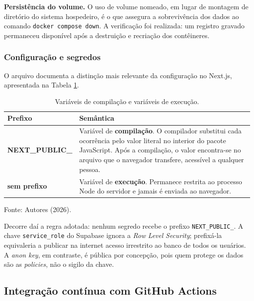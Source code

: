 \documentclass[12pt,a4paper]{article}
\begin{document}
\textbf{Persistência do volume.} O uso de volume nomeado, em lugar de montagem de diretório do sistema hospedeiro, é o que assegura a sobrevivência dos dados ao comando \texttt{docker compose down}. A verificação foi realizada: um registro gravado permaneceu disponível após a destruição e recriação dos contêineres.

\subsubsection{Configuração e segredos}

O arquivo  documenta a distinção mais relevante da configuração no Next.js, apresentada na Tabela \ref{tab:env}.

\begin{table}[H]
\centering
\caption{Variáveis de compilação e variáveis de execução.}
\label{tab:env}
\renewcommand{\arraystretch}{1.4}
\begin{tabularx}{\textwidth}{@{}>{\bfseries\ttfamily\RaggedRight}p{3cm}>{\RaggedRight\arraybackslash}X@{}}
\toprule
\normalfont\textbf{Prefixo} & \textbf{Semântica} \\
\midrule
NEXT\_PUBLIC\_ & Variável de \textbf{compilação}. O compilador substitui cada ocorrência pelo valor literal no interior do pacote JavaScript. Após a compilação, o valor encontra-se no arquivo que o navegador transfere, acessível a qualquer pessoa. \\
sem prefixo & Variável de \textbf{execução}. Permanece restrita ao processo Node do servidor e jamais é enviada ao navegador. \\
\bottomrule
\end{tabularx}
\vspace{0.3cm}

\noindent\footnotesize Fonte: Autores (2026).
\end{table}

Decorre daí a regra adotada: nenhum segredo recebe o prefixo \texttt{NEXT\_PUBLIC\_}. A chave \texttt{service\_role} do Supabase ignora a \textit{Row Level Security}; prefixá-la equivaleria a publicar na internet acesso irrestrito ao banco de todos os usuários. A \textit{anon key}, em contraste, é pública por concepção, pois quem protege os dados são as \textit{policies}, não o sigilo da chave.

\subsection{Integração contínua com GitHub Actions}
\end{document}
